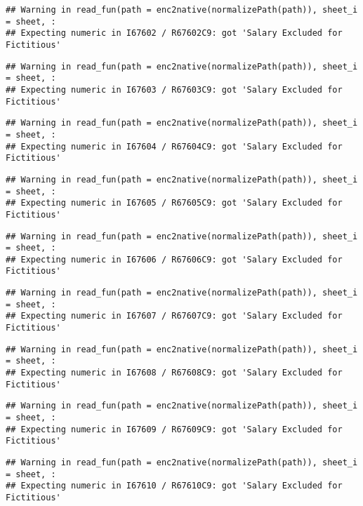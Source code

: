 \documentclass[
]{article}
\begin{document}
\begin{verbatim}
## Warning in read_fun(path = enc2native(normalizePath(path)), sheet_i = sheet, :
## Expecting numeric in I67602 / R67602C9: got 'Salary Excluded for Fictitious'
\end{verbatim}

\begin{verbatim}
## Warning in read_fun(path = enc2native(normalizePath(path)), sheet_i = sheet, :
## Expecting numeric in I67603 / R67603C9: got 'Salary Excluded for Fictitious'
\end{verbatim}

\begin{verbatim}
## Warning in read_fun(path = enc2native(normalizePath(path)), sheet_i = sheet, :
## Expecting numeric in I67604 / R67604C9: got 'Salary Excluded for Fictitious'
\end{verbatim}

\begin{verbatim}
## Warning in read_fun(path = enc2native(normalizePath(path)), sheet_i = sheet, :
## Expecting numeric in I67605 / R67605C9: got 'Salary Excluded for Fictitious'
\end{verbatim}

\begin{verbatim}
## Warning in read_fun(path = enc2native(normalizePath(path)), sheet_i = sheet, :
## Expecting numeric in I67606 / R67606C9: got 'Salary Excluded for Fictitious'
\end{verbatim}

\begin{verbatim}
## Warning in read_fun(path = enc2native(normalizePath(path)), sheet_i = sheet, :
## Expecting numeric in I67607 / R67607C9: got 'Salary Excluded for Fictitious'
\end{verbatim}

\begin{verbatim}
## Warning in read_fun(path = enc2native(normalizePath(path)), sheet_i = sheet, :
## Expecting numeric in I67608 / R67608C9: got 'Salary Excluded for Fictitious'
\end{verbatim}

\begin{verbatim}
## Warning in read_fun(path = enc2native(normalizePath(path)), sheet_i = sheet, :
## Expecting numeric in I67609 / R67609C9: got 'Salary Excluded for Fictitious'
\end{verbatim}

\begin{verbatim}
## Warning in read_fun(path = enc2native(normalizePath(path)), sheet_i = sheet, :
## Expecting numeric in I67610 / R67610C9: got 'Salary Excluded for Fictitious'
\end{verbatim}
\end{document}
